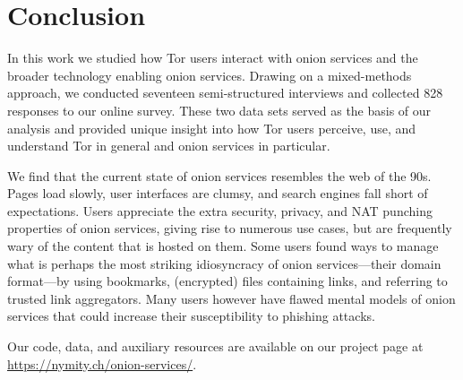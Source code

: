 \section{Conclusion}
\label{sec:conclusion}

In this work we studied how Tor users interact with onion services and the
broader technology enabling onion services.  Drawing on a mixed-methods
approach, we conducted seventeen semi-structured interviews and collected 828
responses to our online survey.  These two data sets served as the basis of our
analysis and provided unique insight into how Tor users perceive, use, and
understand Tor in general and onion services in particular.

We find that the current state of onion services resembles the web of the 90s.
Pages load slowly, user interfaces are clumsy, and search engines fall short of
expectations.  Users appreciate the extra security, privacy, and NAT punching
properties of onion services, giving rise to numerous use cases, but are
frequently wary of the content that is hosted on them.  Some users found ways to
manage what is perhaps the most striking idiosyncracy of onion services---their
domain format---by using bookmarks, (encrypted) files containing links, and
referring to trusted link aggregators.  Many users however have flawed mental
models of onion services that could increase their susceptibility to phishing
attacks.

Our code, data, and auxiliary resources are available on our project page at
\url{https://nymity.ch/onion-services/}.
